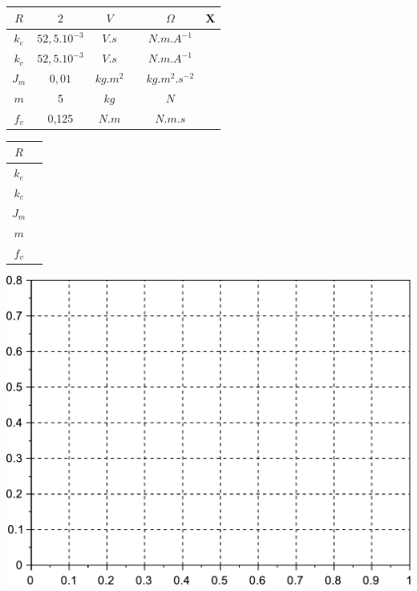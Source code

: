 \begin{center}
\begin{tabular}{|c|c||c|c|c|c|}
\hline
$R$ & $2$ & $V$ & & $\Omega$ & X \\
\hline
$k_e$ & $52,5.10^{-3}$ & $V.s$ & & $N.m.A^{-1}$ & \\
\hline
$k_c$ & $52,5.10^{-3}$ & $V.s$ & & $N.m.A^{-1}$ & \\
\hline
$J_m$ & $0,01$ & $kg.m^2$ & & $kg.m^2.s^{-2}$ & \\
\hline
$m$ & 5 & $kg$ & & $N$ & \\
\hline
$f_v$ & 0,125 & $N.m$ & & $N.m.s$ & \\
\hline
\end{tabular}
\end{center}


\begin{center}
\begin{tabular}{|c|m{3cm}|}
\hline
$R$ &  \\
\hline
$k_e$ &  \\
\hline
$k_c$ &  \\
\hline
$J_m$ &  \\
\hline
$m$ &  \\
\hline
$f_v$ & \\
\hline
\end{tabular}
\end{center}





\begin{center}
 \centering\includegraphics[width=0.8\linewidth]{img/temp_vide}
\end{center}

